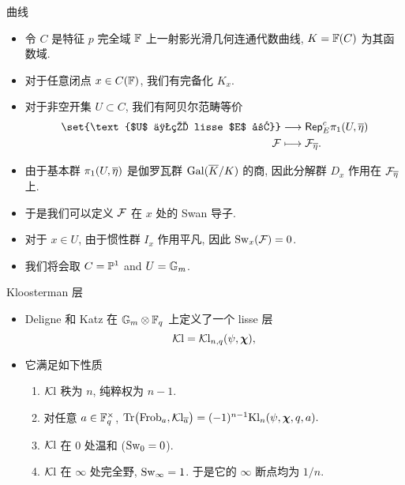 \documentclass[aspectratio=169,handout]{ctexbeamer}
\newcommand\bchi{{\boldsymbol\chi}}
\begin{document}
\begin{frame}{曲线}
	\begin{itemize}
		\item 令 $C$ 是特征 $p$ 完全域 ${\mathbb{F}}$ 上一射影光滑几何连通代数曲线, $K={\mathbb{F}}(C)$ 为其函数域.
		\item 对于任意闭点 $x\in C({\mathbb{F}})$, 我们有完备化 $K_x$.
		\item 对于非空开集 $U\subset C$, 我们有阿贝尔范畴等价
		\begin{align*}
			\set{\text{$U$ 上的 lisse $E$ 层}}&\lra \cRep_E^c \pi_1(U,\ov\eta)\\
			\CF&\lto \CF_{\ov\eta}.
		\end{align*}
		\item 由于基本群 $\pi_1(U,\overline\eta)$ 是伽罗瓦群 ${\mathrm{Gal}}(\overline K/K)$ 的商, 因此分解群 $D_x$ 作用在 ${\mathcal{F}}_{\overline\eta}$ 上.
		\item 于是我们可以定义 ${\mathcal{F}}$ 在 $x$ 处的 Swan 导子.
		\item 对于 $x\in U$, 由于惯性群 $I_x$ 作用平凡, 因此 ${\mathrm{Sw}}_x({\mathcal{F}})=0$.
		\item 我们将会取 $C={\mathbb{P}}^1$ and $U=\mathbb{G}_m$.
	\end{itemize}
\end{frame}


\begin{frame}{Kloosterman 层}
	\begin{itemize}
		\item Deligne 和 Katz 在 $\mathbb{G}_m\otimes {\mathbb{F}}_q$ 上定义了一个 lisse 层
		\[
			\CKl=\CKl_{n,q}(\psi,\bchi),
		\]
		\item 它满足如下性质
		\begin{enumerate}
			\item ${\mathcal{K}\mathrm{l}}$ 秩为 $n$, 纯粹权为 $n-1$.
			\item 对任意 $a\in {\mathbb{F}}_q^\times$,
				$\Tr\bigl(\Frob_a,\CKl_{\ov a}\bigr)=(-1)^{n-1}\Kl_n(\psi,\bchi,q,a).$
			\item ${\mathcal{K}\mathrm{l}}$ 在 $0$ 处温和 (${\mathrm{Sw}}_0=0$).
			\item ${\mathcal{K}\mathrm{l}}$ 在 $\infty$ 处完全野, ${\mathrm{Sw}}_\infty=1$. 于是它的 $\infty$ 断点均为 $1/n$.
		\end{enumerate}
	\end{itemize}
\end{frame}
\end{document}
